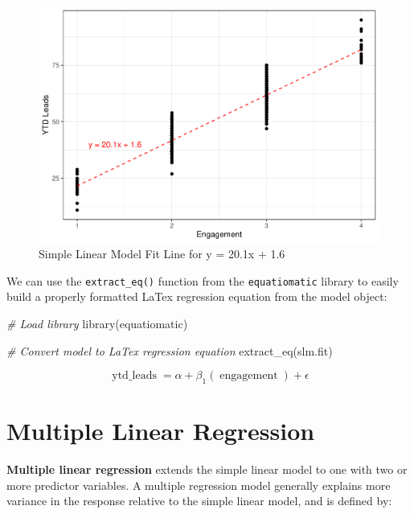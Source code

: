 \documentclass[
]{book}
\newenvironment{Shaded}{\begin{snugshade}}{\end{snugshade}}
\newcommand{\CommentTok}[1]{\textcolor[rgb]{0.56,0.35,0.01}{\textit{#1}}}
\newcommand{\FunctionTok}[1]{\textcolor[rgb]{0.00,0.00,0.00}{#1}}
\newcommand{\NormalTok}[1]{#1}
\begin{document}
\begin{figure}

{\centering \includegraphics[width=1\linewidth]{People_Analytics_Lifecycle_files/figure-latex/slm-fit-1} 

}

\caption{Simple Linear Model Fit Line for y = 20.1x + 1.6}\label{fig:slm-fit}
\end{figure}

We can use the \texttt{extract\_eq()} function from the \texttt{equatiomatic} library to easily build a properly formatted LaTex regression equation from the model object:

\begin{Shaded}
\begin{Highlighting}[]
\CommentTok{\# Load library}
\FunctionTok{library}\NormalTok{(equatiomatic)}

\CommentTok{\# Convert model to LaTex regression equation}
\FunctionTok{extract\_eq}\NormalTok{(slm.fit)}
\end{Highlighting}
\end{Shaded}

\begin{equation}
\operatorname{ytd\_leads} = \alpha + \beta_{1}(\operatorname{engagement}) + \epsilon
\end{equation}

\hypertarget{multiple-linear-regression}{%
\section{Multiple Linear Regression}\label{multiple-linear-regression}}

\textbf{Multiple linear regression} extends the simple linear model to one with two or more predictor variables. A multiple regression model generally explains more variance in the response relative to the simple linear model, and is defined by:
\end{document}
